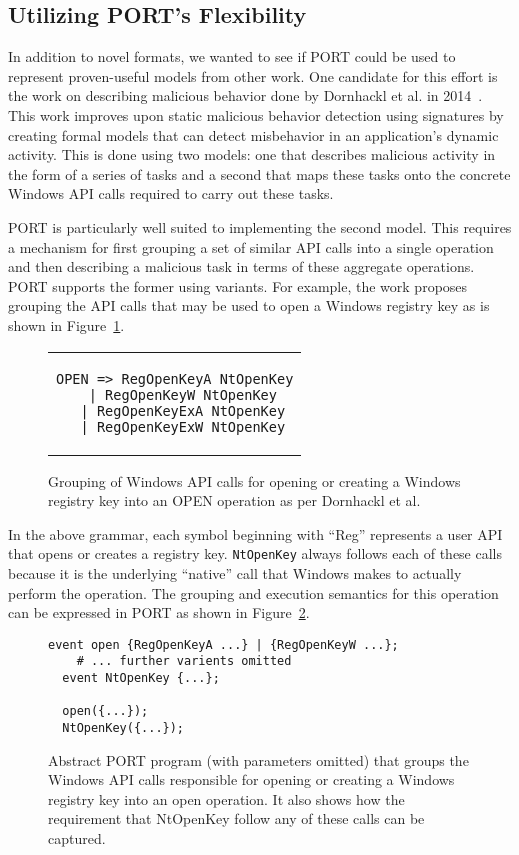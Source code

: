\subsection{Utilizing PORT's Flexibility}
In addition to novel formats, we wanted to see if PORT could be used to
represent proven-useful models from other work.  One candidate for this
effort is the work on describing malicious behavior done by Dornhackl et
al. in 2014~\cite{Dornhackl2014}.  This work improves upon static malicious
behavior detection using signatures by creating formal models that can
detect misbehavior in an application's dynamic activity.  This is done
using two models: one that describes malicious activity in the form of a
series of tasks and a second that maps these tasks onto the concrete
Windows API calls required to carry out these tasks.

PORT is particularly well suited to implementing the second model.  This
requires a mechanism for first grouping a set of similar API calls
into a single operation and then describing a malicious task in terms of
these aggregate operations.  PORT supports the former using variants.
For example, the work proposes grouping the API calls that may be used to
open a Windows registry key as is shown in Figure~\ref{lst:DornhacklOpen}.

\begin{figure}[H]
\centering
\begin{tabular}{c}
\begin{lstlisting}
OPEN => RegOpenKeyA NtOpenKey
  | RegOpenKeyW NtOpenKey
  | RegOpenKeyExA NtOpenKey
  | RegOpenKeyExW NtOpenKey
\end{lstlisting}
\end{tabular}
\caption{Grouping of Windows API calls for opening or creating a Windows
  registry key into an OPEN operation as per Dornhackl et al.}
\label{lst:DornhacklOpen}
\end{figure}


In the above grammar, each symbol beginning with ``Reg'' represents a user
API that opens or creates a registry key.  {\tt NtOpenKey} always follows
each of these calls because it is the underlying ``native'' call that
Windows makes to actually perform the operation.
The grouping and execution semantics for this operation can be expressed
in PORT as shown in Figure~\ref{lst:PORTOpenReg}.


\begin{figure}[H]
\begin{lstlisting}[gobble=2]
  event open {RegOpenKeyA ...} | {RegOpenKeyW ...};
    # ... further varients omitted
  event NtOpenKey {...};

  open({...});
  NtOpenKey({...});
\end{lstlisting}
  \caption{Abstract PORT program (with parameters
  omitted) that groups the Windows API calls responsible for opening or
  creating a Windows registry key into an open operation.  It also shows
  how the requirement that NtOpenKey follow any of these calls can be
  captured.}
\label{lst:PORTOpenReg}
\end{figure}

